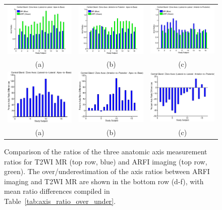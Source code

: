 \begin{figure}
\centering
\begin{tabular}{ccc}
\includegraphics[width=0.3\linewidth]{figs/mr_arfi_central_axes1} &
\includegraphics[width=0.3\linewidth]{figs/mr_arfi_central_axes2} &
\includegraphics[width=0.3\linewidth]{figs/mr_arfi_central_axes3} \\
(a) & (b) & (c) \\
\includegraphics[width=0.3\linewidth]{figs/mr_arfi_central_over_under1.eps} &
\includegraphics[width=0.3\linewidth]{figs/mr_arfi_central_over_under2.eps} &
\includegraphics[width=0.3\linewidth]{figs/mr_arfi_central_over_under3.eps} \\
(a) & (b) & (c) \\
\end{tabular}
\caption{Comparison of the ratios of the three anatomic axis measurement ratios
    for T2WI MR (top row, blue) and ARFI imaging (top row, green).  The
    over/underestimation of the axis ratios between ARFI imaging and T2WI MR
    are shown in the bottom row (d-f), with mean ratio differences compiled in
    Table~\ref{tab:axis_ratio_over_under}.}
\label{fig:mr_arfi_central_axes} 
\end{figure}

